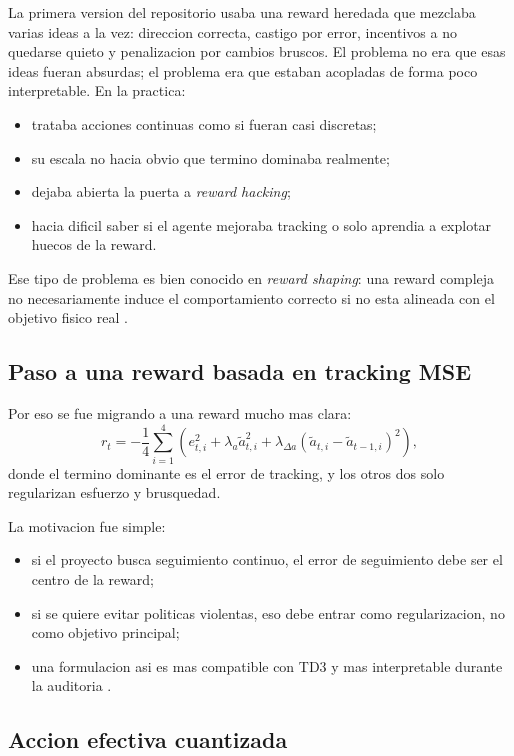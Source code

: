 \documentclass[11pt,a4paper]{article}
\begin{document}
La primera version del repositorio usaba una reward heredada que mezclaba varias ideas a la vez: direccion correcta, castigo por error, incentivos a no quedarse quieto y penalizacion por cambios bruscos. El problema no era que esas ideas fueran absurdas; el problema era que estaban acopladas de forma poco interpretable. En la practica:
\begin{itemize}[leftmargin=1.5em]
\item trataba acciones continuas como si fueran casi discretas;
\item su escala no hacia obvio que termino dominaba realmente;
\item dejaba abierta la puerta a \emph{reward hacking};
\item hacia dificil saber si el agente mejoraba tracking o solo aprendia a explotar huecos de la reward.
\end{itemize}

Ese tipo de problema es bien conocido en \emph{reward shaping}: una reward compleja no necesariamente induce el comportamiento correcto si no esta alineada con el objetivo fisico real \citep{deng2025reward}.

\subsection{Paso a una reward basada en tracking MSE}

Por eso se fue migrando a una reward mucho mas clara:
\[
r_t = -\frac{1}{4}\sum_{i=1}^{4}\left(e_{t,i}^{2} + \lambda_a \tilde{a}_{t,i}^{2} + \lambda_{\Delta a}\left(\tilde{a}_{t,i}-\tilde{a}_{t-1,i}\right)^2\right),
\]
donde el termino dominante es el error de tracking, y los otros dos solo regularizan esfuerzo y brusquedad.

La motivacion fue simple:
\begin{itemize}[leftmargin=1.5em]
\item si el proyecto busca seguimiento continuo, el error de seguimiento debe ser el centro de la reward;
\item si se quiere evitar politicas violentas, eso debe entrar como regularizacion, no como objetivo principal;
\item una formulacion asi es mas compatible con TD3 y mas interpretable durante la auditoria \citep{fujimoto2018td3,lee2024smoothness}.
\end{itemize}

\subsection{Accion efectiva cuantizada}
\end{document}
